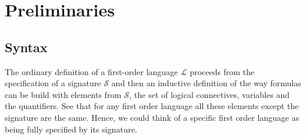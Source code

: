 \chapter{Preliminaries}
\section{Syntax}
The ordinary definition of a first-order language $\mathcal{L}$ proceeds from the specification of a signature $\mathcal{S}$ and then an inductive definition of the way formulas can be build with elements from $\mathcal{S}$, the set of logical connectives, variables and the quantifiers. See that for any first order language all these elements except the signature are the same. Hence, we could think of a specific first order language as being fully specified by its signature.




